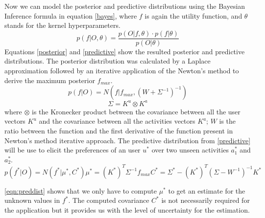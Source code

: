 \documentclass[11pt,a4paper,oneside]{article}
\begin{document}
Now we can model the posterior and predictive distributions using the Bayesian Inference formula in equation \ref{bayes}, where $f$ is again the utility function, and $\theta$ stands for the kernel hyperparameters.
\begin{equation}
    \label{bayes}
    p(f|O, \theta) = \frac{p(O|f,\theta) \cdot p(f|\theta)}{p(O|\theta)} 
\end{equation}
Equations \ref{posterior} and \ref{predictive} show the resulted posterior and predictive distributions. The posterior distribution was calculated by a Laplace approximation followed by an iterative application of the Newton's method to derive the maximum posterior $f_{max}$.
\begin{equation}
    \label{posterior}
    p(f|O) = N(f|f_{max}, (W + \Sigma^{-1})^{-1})
\end{equation}
\begin{equation}
     \Sigma = K^u \otimes K^a
\end{equation}
where $\otimes$ is the Kronecker product between the covariance between all the user vectors $K^u$ and the covariance between all the activities vectors $K^a$; $W$ is the ratio between the function and the first derivative of the function present in Newton's method iterative approach. The predictive distribution from \ref{predictive} will be use to elicit the preferences of an user $u^*$ over two unseen activities $a^*_1$ and $a^*_2$. 
\begin{subequations}
\label{eqn:preddist}
\begin{equation}
    \label{predictive}
    p(f^*|O) = N(f^*|\mu^*, C^*)
\end{equation}
\begin{equation}
    \mu^* = (K^*)^T\Sigma^{-1}f_{max}
\end{equation}
\begin{equation}
    C^* = \Sigma^* - (K^*)^T(\Sigma - W^{-1})^{-1}K^*    
\end{equation}
\end{subequations}

\autoref{eqn:preddist} shows that we only have to compute $\mu^*$ to get an estimate for the unknown values in $f^*$. The computed covariance $C^*$ is not necessarily required for the application but it provides us with the level of uncertainty for the estimation.
 
\end{document}
